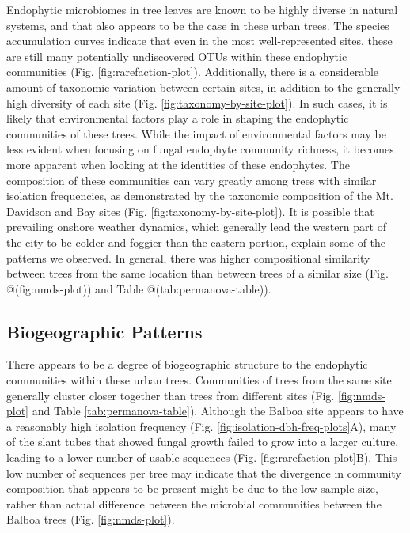 \documentclass[fleqn,10pt,lineno]{wlpeerj} %
\begin{document}
Endophytic microbiomes in tree leaves are known to be highly diverse in natural systems, and that also appears to be the case in these urban trees. The species accumulation curves indicate that even in the most well-represented sites, these are still many potentially undiscovered OTUs within these endophytic communities (Fig. \ref{fig:rarefaction-plot}). Additionally, there is a considerable amount of taxonomic variation between certain sites, in addition to the generally high diversity of each site (Fig. \ref{fig:taxonomy-by-site-plot}). In such cases, it is likely that environmental factors play a role in shaping the endophytic communities of these trees. While the impact of environmental factors may be less evident when focusing on fungal endophyte community richness, it becomes more apparent when looking at the identities of these endophytes. The composition of these communities can vary greatly among trees with similar isolation frequencies, as demonstrated by the taxonomic composition of the Mt. Davidson and Bay sites (Fig. \ref{fig:taxonomy-by-site-plot}). It is possible that prevailing onshore weather dynamics, which generally lead the western part of the city to be colder and foggier than the eastern portion, explain some of the patterns we observed. In general, there was higher compositional similarity between trees from the same location than between trees of a similar size (Fig. @(fig:nmds-plot)) and Table @(tab:permanova-table)).

\hypertarget{biogeographic-patterns-1}{%
\subsection*{Biogeographic Patterns}\label{biogeographic-patterns-1}}

There appears to be a degree of biogeographic structure to the endophytic communities within these urban trees. Communities of trees from the same site generally cluster closer together than trees from different sites (Fig. \ref{fig:nmds-plot} and Table \ref{tab:permanova-table}). Although the Balboa site appears to have a reasonably high isolation frequency (Fig. \ref{fig:isolation-dbh-freq-plots}A), many of the slant tubes that showed fungal growth failed to grow into a larger culture, leading to a lower number of usable sequences (Fig. \ref{fig:rarefaction-plot}B). This low number of sequences per tree may indicate that the divergence in community composition that appears to be present might be due to the low sample size, rather than actual difference between the microbial communities between the Balboa trees (Fig. \ref{fig:nmds-plot}).
\end{document}
